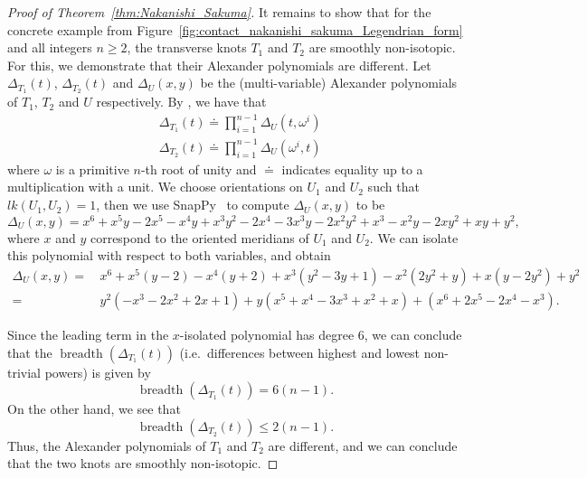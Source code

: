\documentclass[11pt]{amsart}
\theoremstyle{definition}
\theoremstyle{definition}
\theoremstyle{definition}
\theoremstyle{definition}
\begin{document}
\begin{proof}[Proof of Theorem~\ref{thm:Nakanishi_Sakuma}]
It remains to show that for the concrete example from Figure~\ref{fig:contact_nakanishi_sakuma_Legendrian_form} and all integers $n\geq2$, the transverse knots $T_1$ and $T_2$ are smoothly non-isotopic. For this, we demonstrate that their Alexander polynomials are different.
 Let $\Delta_{T_1}(t)$, $\Delta_{T_2}(t)$ and $\Delta_{U}(x,y)$ be the (multi-variable) Alexander polynomials of $T_1$, $T_2$ and $U$ respectively. By \cite{murasugi}, we have that
 \begin{align*}
     &\Delta_{T_1}(t)\doteq\prod_{i=1}^{n-1}\Delta_U(t,\omega^i)\\
     &\Delta_{T_2}(t)\doteq\prod_{i=1}^{n-1}\Delta_U(\omega^i,t)
 \end{align*}
  where $\omega$ is a primitive $n$-th root of unity and $\doteq$ indicates equality up to a multiplication with a unit.
  We choose orientations on $U_1$ and $U_2$ such that $lk(U_1,U_2)=1$, then we use SnapPy~\cite{SnapPy} to compute 
  $\Delta_U(x,y)$ to be 
  \begin{equation*}\label{eq:alex_polynomial_T}
     \Delta_U(x,y)= x^6+x^5y - 2x^5 - x^4y + x^3y^2-2x^4-3x^3y-2x^2y^2+x^3-x^2y-2xy^2+xy+y^2,
  \end{equation*}
  where $x$ and $y$ correspond to the oriented meridians of $U_1$ and $U_2$.
We can isolate this polynomial with respect to both variables, and obtain 
\begin{align*}\label{align:isolated_polynomial}
   \Delta_U(x,y)= &\,x^6+x^5 (y-2)-x^4(y+2)+x^3(y^2-3y+1)-x^2(2y^2+y)+x(y-2y^2)+y^2\\
   = &\,y^2(-x^3-2x^2+2x+1)+y(x^5+x^4-3x^3+x^2+x)+(x^6+2x^5-2x^4-x^3).
\end{align*}

Since the leading term in the $x$-isolated polynomial has degree 6, we can conclude that the $\operatorname{breadth}(\Delta_{T_1}(t))$ (i.e.\ differences between highest and lowest non-trivial powers) is given by
$$\operatorname{breadth}(\Delta_{T_1}(t))=6(n-1).$$
 On the other hand, we see that $$ \operatorname{breadth} (\Delta_{T_2}(t)) \leq 2(n-1).$$
 Thus, the Alexander polynomials of $T_1$ and $T_2$ are different, and we can conclude that the two knots are smoothly non-isotopic. 
 \end{proof}


 
 
\end{document}
